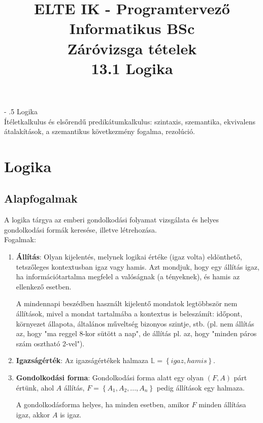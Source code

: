 \documentclass[margin=0px]{article}
\title{\textbf{{\Large ELTE IK - Programtervező Informatikus BSc} \vspace{0.2cm} \\ {\huge Záróvizsga tételek}} \vspace{0.3cm} \\ 13.1 Logika}
\author{}
\date{}
\makeatletter
\renewcommand\paragraph{%
	\@startsection{paragraph}{4}{0mm}%
	{-\baselineskip}%
	{.5\baselineskip}%
	{\normalfont\normalsize\bfseries}}
\newenvironment{tetel}[1]{\paragraph{#1 \\}}{}
\makeatother
\begin{document}
\maketitle

\begin{tetel}{Logika}
    Ítéletkalkulus és elsőrendű predikátumkalkulus: szintaxis, szemantika, ekvivalens átalakítások, a szemantikus következmény fogalma, rezolúció.
\end{tetel}

\section{Logika}

\subsection{Alapfogalmak}

A logika tárgya az emberi gondolkodási folyamat vizsgálata és
helyes gondolkodási formák keresése, illetve létrehozása.\\

\noindent Fogalmak:
\begin{enumerate}
    \item	\textbf{Állítás}: Olyan kijelentés, melynek logikai értéke (igaz
          volta) eldönthető, tetszőleges kontextusban igaz vagy hamis. Azt mondjuk,
          hogy egy állítás igaz, ha információtartalma megfelel a valóságnak (a tényeknek),
          és hamis az ellenkező esetben.

          A mindennapi beszédben használt kijelentő mondatok legtöbbször nem állítások, mivel
          a mondat tartalmába a kontextus is beleszámít: időpont, környezet állapota, általános műveltség
          bizonyos szintje, stb. (pl. nem állítás az, hogy "ma reggel 8-kor sütött a nap", de állítás pl. az, hogy
          "minden páros szám osztható 2-vel").

    \item	\textbf{Igazságérték}: Az igazságértékek halmaza $\mathbb{L}=\left\{igaz,hamis\right\}$.

    \item	\textbf{Gondolkodási forma}: Gondolkodási forma alatt egy olyan $(F,A)$ párt értünk, ahol
          $A$ állítás, $F=\left\{A_{1},A_{2},...,A_{n}\right\}$ pedig állítások egy halmaza.

          A gondolkodásforma helyes, ha minden esetben, amikor $F$ minden állítása
          igaz, akkor $A$ is igaz.
\end{enumerate}
\end{document}
